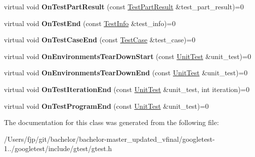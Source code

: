 \begin{DoxyCompactItemize}
virtual void {\bfseries On\+Test\+Part\+Result} (const \mbox{\hyperlink{classtesting_1_1_test_part_result}{Test\+Part\+Result}} \&test\+\_\+part\+\_\+result)=0
\item 
\mbox{\label{classtesting_1_1_test_event_listener_abb1c44525ef038500608b5dc2f17099b}} 
virtual void {\bfseries On\+Test\+End} (const \mbox{\hyperlink{classtesting_1_1_test_info}{Test\+Info}} \&test\+\_\+info)=0
\item 
\mbox{\label{classtesting_1_1_test_event_listener_ae61985e2ef76ac78379b077be57a9c36}} 
virtual void {\bfseries On\+Test\+Case\+End} (const \mbox{\hyperlink{classtesting_1_1_test_case}{Test\+Case}} \&test\+\_\+case)=0
\item 
\mbox{\label{classtesting_1_1_test_event_listener_a468b5e6701bcb86cb2c956caadbba5e4}} 
virtual void {\bfseries On\+Environments\+Tear\+Down\+Start} (const \mbox{\hyperlink{classtesting_1_1_unit_test}{Unit\+Test}} \&unit\+\_\+test)=0
\item 
\mbox{\label{classtesting_1_1_test_event_listener_a9ea04fa7f447865ba76df35e12ba2092}} 
virtual void {\bfseries On\+Environments\+Tear\+Down\+End} (const \mbox{\hyperlink{classtesting_1_1_unit_test}{Unit\+Test}} \&unit\+\_\+test)=0
\item 
\mbox{\label{classtesting_1_1_test_event_listener_a550fdb3e55726e4cefa09f5697941425}} 
virtual void {\bfseries On\+Test\+Iteration\+End} (const \mbox{\hyperlink{classtesting_1_1_unit_test}{Unit\+Test}} \&unit\+\_\+test, int iteration)=0
\item 
\mbox{\label{classtesting_1_1_test_event_listener_ad15b6246d94c268e233487a86463ef3d}} 
virtual void {\bfseries On\+Test\+Program\+End} (const \mbox{\hyperlink{classtesting_1_1_unit_test}{Unit\+Test}} \&unit\+\_\+test)=0
\end{DoxyCompactItemize}


The documentation for this class was generated from the following file\+:\begin{DoxyCompactItemize}
\item 
/\+Users/fjp/git/bachelor/bachelor-\/master\+\_\+updated\+\_\+vfinal/googletest-\/1../googletest/include/gtest/gtest.\+h\end{DoxyCompactItemize}
